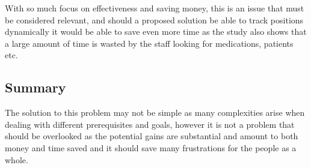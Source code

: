With so much focus on effectiveness and saving money, this is an issue that must be considered relevant, and should a proposed solution be able to track positions dynamically it would be able to save even more time as the study also shows that a large amount of time is wasted by the staff looking for medications, patients etc.

\subsection{Summary}
The solution to this problem may not be simple as many complexities arise when dealing with different prerequisites and goals, however it is not a problem that should be overlooked as the potential gains are substantial and amount to both money and time saved and it should save many frustrations for the people as a whole.